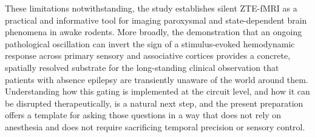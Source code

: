 \documentclass[11pt]{article}
\begin{document}
These limitations notwithstanding, the study establishes silent ZTE-fMRI as a practical and informative tool for imaging paroxysmal and state-dependent brain phenomena in awake rodents. More broadly, the demonstration that an ongoing pathological oscillation can invert the sign of a stimulus-evoked hemodynamic response across primary sensory and associative cortices provides a concrete, spatially resolved substrate for the long-standing clinical observation that patients with absence epilepsy are transiently unaware of the world around them. Understanding how this gating is implemented at the circuit level, and how it can be disrupted therapeutically, is a natural next step, and the present preparation offers a template for asking those questions in a way that does not rely on anesthesia and does not require sacrificing temporal precision or sensory control.



\end{document}
